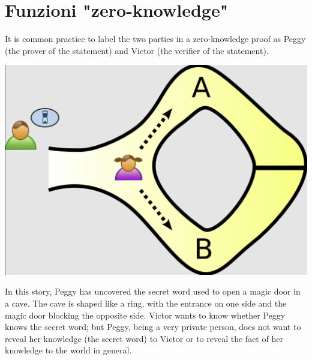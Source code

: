 \documentclass[11pt, oneside]{article}   	%
\begin{document}
\section*{Funzioni "zero-knowledge"}
It is common practice to label the two parties in a zero-knowledge proof as Peggy (the prover of the statement) and Victor (the verifier of the statement).\\
\begin{center}
\includegraphics[scale= 0.3]{0k}
\end{center}
In this story, Peggy has uncovered the secret word used to open a magic door in a cave. The cave is shaped like a ring, with the entrance on one side and the magic door blocking the opposite side. Victor wants to know whether Peggy knows the secret word; but Peggy, being a very private person, does not want to reveal her knowledge (the secret word) to Victor or to reveal the fact of her knowledge to the world in general.\\
\end{document}
